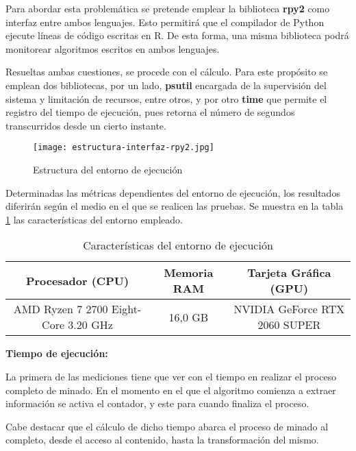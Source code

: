 Para abordar esta problemática se pretende emplear la biblioteca \textbf{rpy2} \cite{rpy2} como interfaz 
entre ambos lenguajes. Esto permitirá que el compilador de Python ejecute líneas de código escritas en R. 
De esta forma, una misma biblioteca podrá monitorear algoritmos escritos en ambos lenguajes.

Resueltas ambas cuestiones, se procede con el cálculo. Para este propósito se emplean dos bibliotecas, por
un lado, \textbf{psutil} \cite{psutil} encargada de la supervisión del sistema y limitación de recursos, 
entre otros, y por otro \textbf{time} que permite el registro del tiempo de ejecución, pues retorna el 
número de segundos transcurridos desde un cierto instante.

\begin{figure}[tphb]
  \centering
  \texttt{[image: estructura-interfaz-rpy2.jpg]}
  \caption{Estructura del entorno de ejecución}
  \label{img:estructura del entorno de ejecucion}
\end{figure}

Determinadas las métricas dependientes del entorno de ejecución, los resultados diferirán según el medio 
en el que se realicen las pruebas. Se muestra en la tabla \ref{tab:caracteristicas del entorno de ejecucion} 
las características del entorno empleado.

\begin{table}[h]
  \begin{center}
    \begin{tabular}{| c | c | c |} \hline 
     \textbf{Procesador (CPU)} & \textbf{Memoria RAM} & \textbf{Tarjeta Gráfica (GPU)} \\ \hline
     AMD Ryzen 7 2700 Eight-Core 3.20 GHz & 16,0 GB & NVIDIA GeForce RTX 2060 SUPER \\ \hline
    \end{tabular}
    \caption{Características del entorno de ejecución}
    \label{tab:caracteristicas del entorno de ejecucion}
  \end{center}
\end{table} 

\textbf{Tiempo de ejecución:}

La primera de las mediciones tiene que ver con el tiempo en realizar el proceso completo de minado. En el 
momento en el que el algoritmo comienza a extraer información se activa el contador, y este para cuando 
finaliza el proceso.

Cabe destacar que el cálculo de dicho tiempo abarca el proceso de minado al completo, desde el acceso al
contenido, hasta la transformación del mismo.

